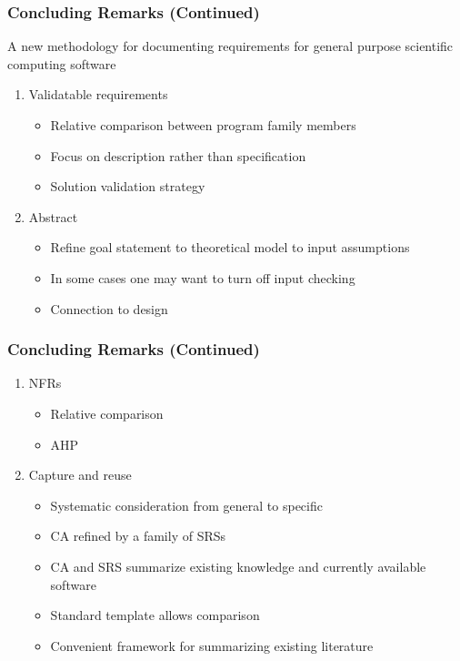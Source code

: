 \documentclass[t,12pt,numbers,fleqn]{beamer}
\newcounter{temp}
\begin{document}

\begin{frame}

\frametitle{Concluding Remarks (Continued)}

A new methodology for documenting requirements for general purpose scientific computing software

\setcounter{temp}{0}

\begin{enumerate}
\setcounter{enumi}{\value{temp}}

\item Validatable requirements
\begin{itemize}
\item Relative comparison between program family members
\item Focus on description rather than specification
\item Solution validation strategy
\end{itemize}
\item Abstract
\begin{itemize}
\item Refine goal statement to theoretical model to input assumptions
\item In some cases one may want to turn off input checking
\item Connection to design
\end{itemize}

\setcounter{temp}{\value{enumi}}
\end{enumerate}

\end{frame}


\begin{frame}

\frametitle{Concluding Remarks (Continued)}

\begin{enumerate}
\setcounter{enumi}{\value{temp}}

\item NFRs
\begin{itemize}
\item Relative comparison
\item AHP
\end{itemize}
\item Capture and reuse
\begin{itemize}
\item Systematic consideration from general to specific
\item CA refined by a family of SRSs
\item CA and SRS summarize existing knowledge and currently available software
\item Standard template allows comparison
\item Convenient framework for summarizing existing literature
\end{itemize}

\setcounter{temp}{\value{enumi}}
\end{enumerate}

\end{frame}
\end{document}
